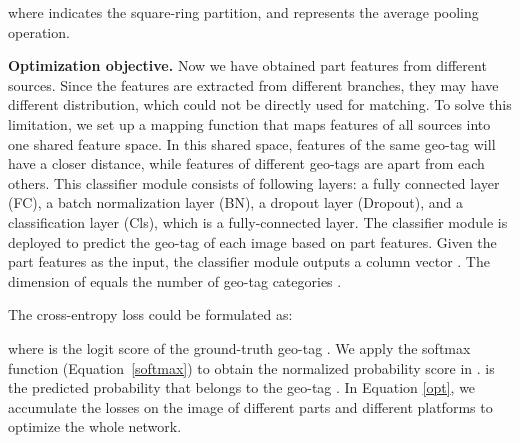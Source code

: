 \documentclass[journal]{IEEEtran}
\begin{document}
where  indicates the square-ring partition, and  represents the average pooling operation.


\textbf{Optimization objective.}
Now we have obtained part features from different sources. Since the features are extracted from different branches, they may have different distribution, which could not be directly used for matching. 
To solve this limitation, we set up a mapping function that maps features of all sources into one shared feature space. 
In this shared space, features of the same geo-tag will have a closer distance, while features of different geo-tags are apart from each others.
This classifier module consists of following layers: a fully connected layer (FC), a batch normalization layer (BN), a dropout layer (Dropout), and a classification layer (Cls), which is a fully-connected layer. 
The classifier module is deployed to predict the geo-tag of each image based on part features. 
Given the part features  as the input, the classifier module outputs a column vector . The dimension of  equals the number of geo-tag categories .

The cross-entropy loss could be formulated as:


where  is  the logit score  of the ground-truth geo-tag  . We apply the softmax function (Equation~\ref{softmax}) to obtain the normalized probability score  in .  is the predicted probability that  belongs to the geo-tag  . 
In Equation \ref{opt}, we accumulate the losses on the image of different parts and different platforms to optimize the whole network. 
\end{document}
